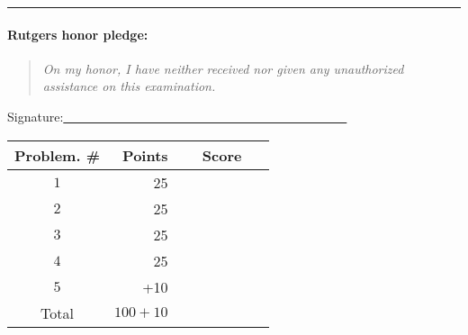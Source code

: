 \documentclass{article}
\theoremstyle{definition}
\def\fline{\rule{0.75\linewidth}{0.5pt}}
\newcommand{\finishline}{\vspace{-15pt}\begin{center}\fline\end{center}}
\begin{document}
\finishline

\paragraph{Rutgers honor pledge:} 

\begin{quote}
\emph{On my honor, I have neither received nor given any unauthorized assistance on this
examination.} 
\end{quote}
\hfill{Signature:\underline{~~~~~~~~~~~~~~~~~~~~~~~~~~~~~~~~~~~~~~~~~~~~~}}

\bigskip

\begin{center}
\begin{tabular}{|c|r|c|}
\hline
Problem. \# & Points & Score \\ \hline\hline
$1$ & 25 & ~~~~~~~~~~~\\  \hline
$2$ & 25 & \\ \hline
$3$ & 25 & \\ \hline
$4$ & 25 & \\ \hline
$5$ & +10 & \\ \hline
Total & $100 + 10$ & \\ \hline
\end{tabular}
\end{center}

\newpage
\end{document}
